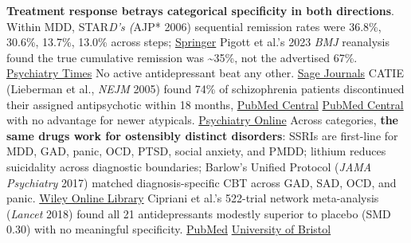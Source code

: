 \textbf{Treatment response betrays categorical specificity in both directions}. Within MDD, STAR\emph{D's (}AJP* 2006) sequential remission rates were 36.8\%, 30.6\%, 13.7\%, 13.0\% across steps; \href{https://link.springer.com/article/10.1007/s11920-007-0061-3}{Springer} Pigott et al.'s 2023 \emph{BMJ} reanalysis found the true cumulative remission was \textasciitilde35\%, not the advertised 67\%. \href{https://www.psychiatrictimes.com/view/star-d-s-cumulative-remission-rate-and-why-it-still-matters}{Psychiatry Times} No active antidepressant beat any other. \href{https://journals.sagepub.com/doi/pdf/10.1177/070674371005500303}{Sage Journals} CATIE (Lieberman et al., \emph{NEJM} 2005) found 74\% of schizophrenia patients discontinued their assigned antipsychotic within 18 months, \href{https://pmc.ncbi.nlm.nih.gov/articles/PMC6482974/}{PubMed Central} \href{https://pmc.ncbi.nlm.nih.gov/articles/PMC5935444/}{PubMed Central} with no advantage for newer atypicals. \href{https://psychiatryonline.org/doi/10.1176/appi.ajp.2011.11010039}{Psychiatry Online} Across categories, \textbf{the same drugs work for ostensibly distinct disorders}: SSRIs are first-line for MDD, GAD, panic, OCD, PTSD, social anxiety, and PMDD; lithium reduces suicidality across diagnostic boundaries; Barlow's Unified Protocol (\emph{JAMA Psychiatry} 2017) matched diagnosis-specific CBT across GAD, SAD, OCD, and panic. \href{https://onlinelibrary.wiley.com/doi/10.1002/wps.20748}{Wiley Online Library} Cipriani et al.'s 522-trial network meta-analysis (\emph{Lancet} 2018) found all 21 antidepressants modestly superior to placebo (SMD 0.30) with no meaningful specificity. \href{https://pubmed.ncbi.nlm.nih.gov/29477251/}{PubMed} \href{https://research-information.bris.ac.uk/en/publications/comparative-efficacy-and-acceptability-of-21-antidepressant-drugs/}{University of Bristol}

